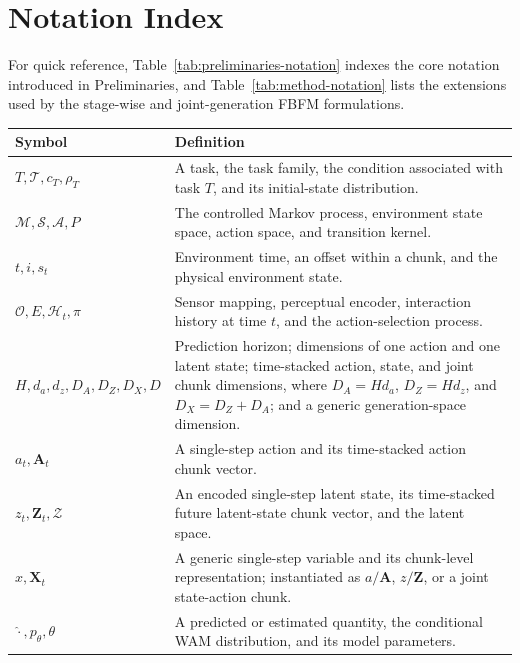 
\section{Notation Index}
\label{app:notation-index}

For quick reference, Table~\ref{tab:preliminaries-notation} indexes the core
notation introduced in Preliminaries, and Table~\ref{tab:method-notation} lists
the extensions used by the stage-wise and joint-generation FBFM formulations.

\begin{table}[H]
    \centering
    \small
    \renewcommand{\arraystretch}{1.12}
    \begin{tabular}{p{} p{}}
        \hline
        \textbf{Symbol} & \textbf{Definition}\\
        \hline
        $T,\mathcal{T},c_T,\rho_T$
        & A task, the task family, the condition associated with task $T$, and its initial-state distribution.\\
        $\mathcal{M},\mathcal{S},\mathcal{A},P$
        & The controlled Markov process, environment state space, action space, and transition kernel.\\
        $t,i,s_t$
        & Environment time, an offset within a chunk, and the physical environment state.\\
        $\mathcal{O},E,\mathcal{H}_t,\pi$
        & Sensor mapping, perceptual encoder, interaction history at time $t$, and the action-selection process.\\
        $H,d_a,d_z,D_A,D_Z,D_X,D$
        & Prediction horizon; dimensions of one action and one latent state; time-stacked action, state, and joint chunk dimensions, where $D_A=Hd_a$, $D_Z=Hd_z$, and $D_X=D_Z+D_A$; and a generic generation-space dimension.\\
        $a_t,\mathbf{A}_t$
        & A single-step action and its time-stacked action chunk vector.\\
        $z_t,\mathbf{Z}_t,\mathcal{Z}$
        & An encoded single-step latent state, its time-stacked future latent-state chunk vector, and the latent space.\\
        $x,\mathbf{X}_t$
        & A generic single-step variable and its chunk-level representation; instantiated as $a/\mathbf A$, $z/\mathbf Z$, or a joint state-action chunk.\\
        $\hat{\cdot},p_\theta,\theta$
        & A predicted or estimated quantity, the conditional WAM distribution, and its model parameters.\\

\end{tabular}
\end{table}
